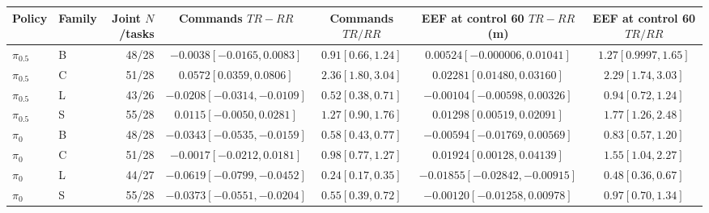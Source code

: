 \begin{table}[t]
\centering\footnotesize
\setlength{\tabcolsep}{2.4pt}
\begin{tabular}{@{}llrcccc@{}}
\toprule
Policy & Family & \shortstack{Joint\\$N$/tasks} & \shortstack{Commands\\$TR-RR$} & \shortstack{Commands\\$TR/RR$} & \shortstack{EEF at control 60\\$TR-RR$ (m)} & \shortstack{EEF at control 60\\$TR/RR$}\\
\midrule
$\pi_{0.5}$ & B & 48/28 & $-0.0038[-0.0165,0.0083]$ & $0.91[0.66,1.24]$ & $0.00524[-0.000006,0.01041]$ & $1.27[0.9997,1.65]$\\
$\pi_{0.5}$ & C & 51/28 & $0.0572[0.0359,0.0806]$ & $2.36[1.80,3.04]$ & $0.02281[0.01480,0.03160]$ & $2.29[1.74,3.03]$\\
$\pi_{0.5}$ & L & 43/26 & $-0.0208[-0.0314,-0.0109]$ & $0.52[0.38,0.71]$ & $-0.00104[-0.00598,0.00326]$ & $0.94[0.72,1.24]$\\
$\pi_{0.5}$ & S & 55/28 & $0.0115[-0.0050,0.0281]$ & $1.27[0.90,1.76]$ & $0.01298[0.00519,0.02091]$ & $1.77[1.26,2.48]$\\
\midrule
$\pi_0$ & B & 48/28 & $-0.0343[-0.0535,-0.0159]$ & $0.58[0.43,0.77]$ & $-0.00594[-0.01769,0.00569]$ & $0.83[0.57,1.20]$\\
$\pi_0$ & C & 51/28 & $-0.0017[-0.0212,0.0181]$ & $0.98[0.77,1.27]$ & $0.01924[0.00128,0.04139]$ & $1.55[1.04,2.27]$\\
$\pi_0$ & L & 44/27 & $-0.0619[-0.0799,-0.0452]$ & $0.24[0.17,0.35]$ & $-0.01855[-0.02842,-0.00915]$ & $0.48[0.36,0.67]$\\
$\pi_0$ & S & 55/28 & $-0.0373[-0.0551,-0.0204]$ & $0.55[0.39,0.72]$ & $-0.00120[-0.01258,0.00978]$ & $0.97[0.70,1.34]$\\
\bottomrule
\end{tabular}

\label{tab:supp-matched-motion}
\end{table}

